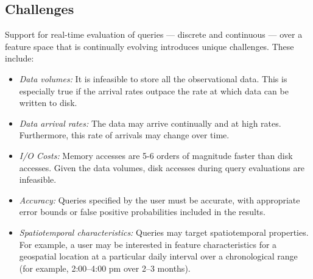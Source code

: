 \subsection{Challenges}
Support for real-time evaluation of queries --- discrete and continuous --- over a feature space that is continually evolving introduces unique challenges. These include:
\begin{itemize}
    \item   \emph{Data volumes:} It is infeasible to store all the observational data. This is especially true if the arrival rates outpace the rate at which data can be written to disk.
    \item   \emph{Data arrival rates:} The data may arrive continually and at high rates. Furthermore, this rate of arrivals may change over time.
    \item \emph{I/O Costs:} Memory accesses are 5-6 orders of magnitude faster than disk accesses. Given the data volumes, disk accesses during query evaluations are infeasible.
    \item   \emph{Accuracy:} Queries specified by the user must be accurate, with appropriate error bounds or false positive probabilities included in the results.
    \item   \emph{Spatiotemporal characteristics:} Queries may target spatiotemporal properties. For example, a user may be interested in feature characteristics for a geospatial location at a particular daily interval over a chronological range (for example, 2:00--4:00 pm over 2--3 months).
\end{itemize}

